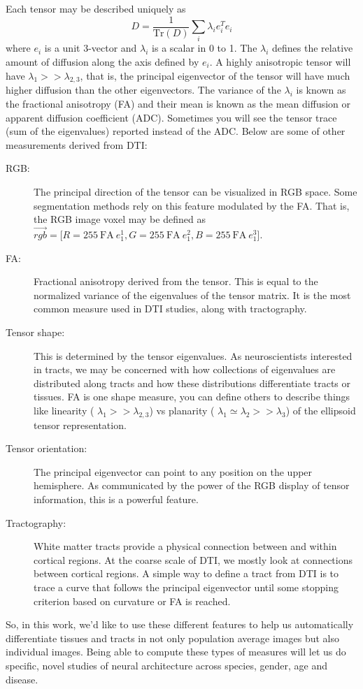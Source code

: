 \documentclass[11pt,english]{article}
\begin{document}
Each tensor may be described uniquely as
$$D= \frac1{\mathrm{Tr}(D)}\sum_i \lambda_i e_i^T e_i $$ where $e_i$ is a unit 3-vector and
$\lambda_i$ is a scalar in 0 to 1.  The $\lambda_i$ defines the
relative amount of diffusion along the axis defined by $e_i$.  A
highly anisotropic tensor will have $\lambda_1 >> \lambda_{2,3} $, that
is, the principal eigenvector of the tensor will have much higher
diffusion than the other eigenvectors.   The variance of the
$\lambda_i$ is known as the fractional anisotropy (FA) and their mean is
known as the mean diffusion or apparent diffusion coefficient (ADC). Sometimes you will see the
tensor trace (sum of the eigenvalues) reported instead of the ADC. Below are some of other measurements derived from DTI:
\begin{description}
\item[RGB:] The principal direction of the tensor can be visualized in
  RGB space.  Some segmentation methods rely on this feature 
  modulated by the FA.  That is, the RGB image voxel may be defined as
  $\vec{rgb}=[R=255~\text{FA}~e_1^1, G=255~\text{FA}~e_1^2, B=255~\text{FA}~e_1^3$].
\item[FA:] Fractional anisotropy derived from the tensor.  This is
  equal to the normalized variance of the eigenvalues of the tensor matrix.  It
  is the most common measure used in DTI studies, along with
  tractography. 
\item[Tensor shape:]  This is determined by the tensor eigenvalues.  As
  neuroscientists interested in tracts, we may be concerned with how
  collections of eigenvalues are distributed along tracts and how
  these distributions differentiate tracts or tissues. FA is one shape measure, you can define others to describe
  things like linearity ( $\lambda_1 >> \lambda_{2,3} $) vs planarity ( $\lambda_1 \simeq \lambda_2 >> \lambda_3 $)
  of the ellipsoid tensor representation.
\item[Tensor orientation:] The principal
  eigenvector can point to any position on the upper hemisphere.  As
  communicated by the power of the RGB display of tensor information,
  this is a powerful feature. 
\item[Tractography:] White matter tracts provide a physical connection
  between and within cortical regions.  At the coarse scale of DTI, we mostly
  look at connections between cortical regions.  A simple way to
  define a tract from DTI is to trace a curve that follows the principal eigenvector until
  some stopping criterion based on curvature or FA is reached. 
\end{description}
So, in this work, we'd like to use these different features to help us
automatically differentiate tissues and tracts in not only population
average images but also individual images.  Being able to compute
these types of measures will let us do specific, novel studies of
neural architecture across species, gender, age and disease.
\end{document}
